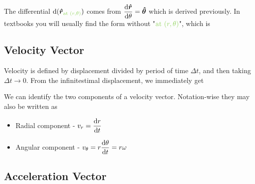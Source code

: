 \documentclass[class=article, crop=false, 12pt]{standalone}
\begin{document}

The differential $\dd{(\hhat{r}_\green{\text{at }(r,\theta)})}$ comes from 
$\dvv{\hhat{r}}{\theta} = \hhat{\theta}$ which is derived previously. 
In textbooks you will usually find the form without "$\green{\text{at }(r,\theta)}$", 
which is




\subsection{Velocity Vector}

Velocity is defined by displacement divided by period of time $\Delta t$, and then taking $\Delta t \to 0$.
From the infinitestimal displacement, we immediately get

We can identify the two components of a velocity vector. 
Notation-wise they may also be written as
\begin{itemize}
    \item Radial component - $\displaystyle v_r = \dv{r}{t}$ 
    \item Angular component - $\displaystyle v_\theta = r\dv{\theta}{t} = r\omega$
\end{itemize}




\subsection{Acceleration Vector}
\end{document}
